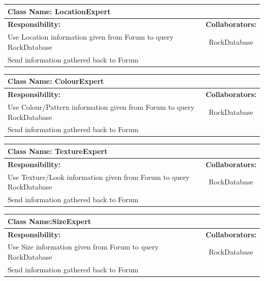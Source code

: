 \documentclass[titlepage]{article}
\begin{document}
\begin{table}[!ht]
	\centering
	\begin{tabular}{| p{8cm} | c |} \hline
		\multicolumn{2}{|l|}{\textbf{Class Name: LocationExpert}} \\ \hline
		\textbf{Responsibility:} & \textbf{Collaborators:} \\ \hline
		Use Location information given from Forum to query RockDatabase & RockDatabase\\ \hline
		Send information gathered back to Forum & \\ \hline
	\end{tabular}
\end{table}

\begin{table}[!ht]
	\centering
	\begin{tabular}{| p{8cm} | c |} \hline
		\multicolumn{2}{|l|}{\textbf{Class Name: ColourExpert}} \\ \hline
		\textbf{Responsibility:} & \textbf{Collaborators:} \\ \hline
		Use Colour/Pattern information given from Forum to query RockDatabase & RockDatabase\\ \hline
		Send information gathered back to Forum & \\ \hline
	\end{tabular}
\end{table}

\begin{table}[!ht]
	\centering
	\begin{tabular}{| p{8cm} | c |} \hline
		\multicolumn{2}{|l|}{\textbf{Class Name: TextureExpert}} \\ \hline
		\textbf{Responsibility:} & \textbf{Collaborators:} \\ \hline
		Use Texture/Look information given from Forum to query RockDatabase & RockDatabase\\ \hline
		Send information gathered back to Forum & \\ \hline
	\end{tabular}
\end{table}

\begin{table}[!ht]
	\centering
	\begin{tabular}{| p{8cm} | c |} \hline
		\multicolumn{2}{|l|}{\textbf{Class Name:SizeExpert}} \\ \hline
		\textbf{Responsibility:} & \textbf{Collaborators:} \\ \hline
		Use Size information given from Forum to query RockDatabase & RockDatabase\\ \hline
		Send information gathered back to Forum & \\ \hline
	\end{tabular}
\end{table}
\end{document}
